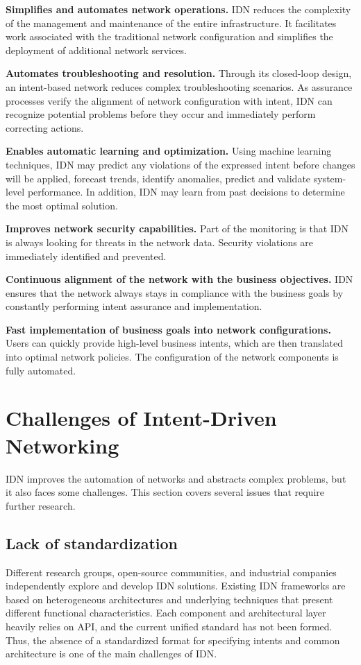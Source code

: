 \textbf{Simplifies and automates network operations.} IDN reduces the complexity of the management and maintenance of the entire infrastructure. It facilitates work associated with the traditional network configuration and simplifies the deployment of additional network services.

\textbf{Automates troubleshooting and resolution.} Through its closed-loop design, an intent-based network reduces complex troubleshooting scenarios. As assurance processes verify the alignment of network configuration with intent, IDN can recognize potential problems before they occur and immediately perform correcting actions.

\textbf{Enables automatic learning and optimization.} Using machine learning techniques, IDN may predict any violations of the expressed intent before changes will be applied, forecast trends, identify anomalies, predict and validate system-level performance. In addition, IDN may learn from past decisions to determine the most optimal solution.

\textbf{Improves network security capabilities.} Part of the monitoring is that IDN is always looking for threats in the network data. Security violations are immediately identified and prevented.

\textbf{Continuous alignment of the network with the business objectives.} IDN ensures that the network always stays in compliance with the business goals by constantly performing intent assurance and implementation.

\textbf{Fast implementation of business goals into network configurations.} Users can quickly provide high-level business intents, which are then translated into optimal network policies. The configuration of the network components is fully automated.



\section{Challenges of Intent-Driven Networking}

IDN improves the automation of networks and abstracts complex problems, but it also faces some challenges. This section covers several issues that require further research.

\subsection{Lack of standardization}
Different research groups, open-source communities, and industrial companies independently explore and develop IDN solutions. Existing IDN frameworks are based on heterogeneous architectures and underlying techniques that present different functional characteristics. Each component and architectural layer heavily relies on API, and the current unified standard has not been formed. Thus, the absence of a standardized format for specifying intents and common architecture is one of the main challenges of IDN.\cite{8968429}

